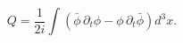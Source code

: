 \begin{equation}
Q=\frac{1}{2i}\int \left( \bar{\phi}\,\partial _{t}\phi -\phi \,\partial _{t}%
\bar{\phi}\right) d^{3}x.
\end{equation}%
